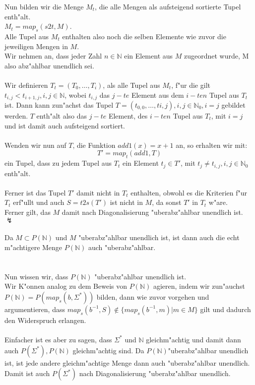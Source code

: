 \documentclass{article}
\newcommand{\gap}{\null\ \\ \\}
\begin{document}
Nun bilden wir die Menge $M_t$, die alle Mengen als aufsteigend sortierte Tupel
    enth"alt.\\
$M_t = map_s(s2t, M)$.\\
Alle Tupel aus $M_t$ enthalten also noch
    die selben Elemente wie zuvor die jeweiligen Mengen in $M$.\\
Wir nehmen an, dass jeder Zahl $n \in \mathbb{N}$ ein Element aus $M$
    zugeordnet wurde, M also abz"ahlbar unendlich sei.\\
\\
Wir definieren $T_t = (T_0, \ldots, T_i)$, als alle 
    Tupel aus $M_t$, f"ur die gilt $t_{i,j} < t_{i+1,j}, i,j \in \mathbb{N}$, 
    wobei $t_{i,j}$ das $j-te$ Element aus dem $i-ten$ Tupel aus $T_t$ ist.
    Dann kann zun"achst das Tupel $
    T = (t_{0,0}, \ldots, t{i,j}), i,j \in \mathbb{N}_0, i=j
    $ gebildet werden. $T$ enth"alt also das $j-te$ Element, des $i-ten$ Tupel 
    aus $T_t$, mit $i=j$ und ist damit auch aufsteigend sortiert.\\
\\
Wenden wir nun auf $T$, die Funktion $add1(x) = x+1$ an, so erhalten wir
    mit:\[
    T' = map_t(add1, T)
    \]
ein Tupel, dass zu jedem Tupel aus $T_t$ ein
    Element $t_j \in T'$, mit $t_j \neq t_{i,j}, i,j \in \mathbb{N}_0$ enth"alt.\\
\\
Ferner ist das Tupel $T'$ damit nicht in $T_t$ enthalten, obwohl es die Kriterien 
    f"ur $T_t$ erf"ullt und auch $S=t2s(T')$ ist nicht in $M$, da sonst
    $T'$ in $T_t$ w"are.\\
Ferner gilt, das $M$ damit nach Diagonalisierung "uberabz"ahlbar unendlich
    ist. $\lightning$\\
\\
Da $M \subset P(\mathbb{N})$ und $M$ "uberabz"ahlbar unendlich ist, ist dann auch
    die echt m"achtigere Menge $P(\mathbb{N})$ auch "uberabz"ahlbar.\\
\gap
Nun wissen wir, dass $P(\mathbb{N})$ "uberabz"ahlbar unendlich ist.\\
Wir K"onnen analog zu dem Beweis von $P(\mathbb{N})$ agieren, indem wir 
    zun"auchst $P(\mathbb{N}) = P(map_s(b, \Sigma^*))$ bilden, dann wie zuvor 
    vorgehen und argumentieren, dass 
    $map_s(b^{-1}, S) \not \in \{map_s(b^{-1}, m) | m \in M\}$ gilt
    und dadurch den Widerspruch erlangen.\\
\\
Einfacher ist es aber zu sagen, dass $\Sigma^*$ und $\mathbb{N}$ gleichm"achtig
    und damit dann auch $P(\Sigma^*), P(\mathbb{N})$ gleichm"achtig sind. Da
    $P(\mathbb{N})$"uberabz"ahlbar unendlich ist, ist jede andere gleichm"achtige
    Menge dann auch "uberabz"ahlbar unendlich.\\
Damit ist auch $P(\Sigma^*)$ nach Diagonalisierung "uberabz"ahlbar unendlich.\\
\end{document}

